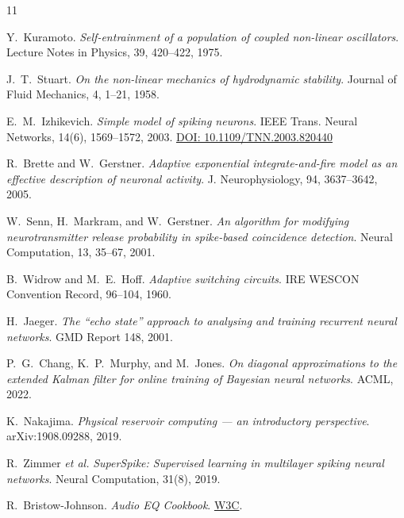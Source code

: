 \documentclass[twocolumn,10pt]{article}
\begin{document}
\begin{thebibliography}{11}

Y.~Kuramoto.
\emph{Self-entrainment of a population of coupled non-linear oscillators}.
Lecture Notes in Physics, 39, 420--422, 1975.

J.~T.~Stuart.
\emph{On the non-linear mechanics of hydrodynamic stability}.
Journal of Fluid Mechanics, 4, 1--21, 1958.

E.~M.~Izhikevich.
\emph{Simple model of spiking neurons}.
IEEE Trans. Neural Networks, 14(6), 1569--1572, 2003.
\href{https://doi.org/10.1109/TNN.2003.820440}{DOI: 10.1109/TNN.2003.820440}

R.~Brette and W.~Gerstner.
\emph{Adaptive exponential integrate-and-fire model as an effective description of neuronal activity}.
J. Neurophysiology, 94, 3637--3642, 2005.

W.~Senn, H.~Markram, and W.~Gerstner.
\emph{An algorithm for modifying neurotransmitter release probability in spike-based coincidence detection}.
Neural Computation, 13, 35--67, 2001.

B.~Widrow and M.~E.~Hoff.
\emph{Adaptive switching circuits}.
IRE WESCON Convention Record, 96--104, 1960.

H.~Jaeger.
\emph{The ``echo state'' approach to analysing and training recurrent neural networks}.
GMD Report 148, 2001.

P.~G.~Chang, K.~P.~Murphy, and M.~Jones.
\emph{On diagonal approximations to the extended Kalman filter for online training of Bayesian neural networks}.
ACML, 2022.

K.~Nakajima.
\emph{Physical reservoir computing --- an introductory perspective}.
arXiv:1908.09288, 2019.

R.~Zimmer \emph{et al.}
\emph{SuperSpike: Supervised learning in multilayer spiking neural networks}.
Neural Computation, 31(8), 2019.

R.~Bristow-Johnson.
\emph{Audio EQ Cookbook}.
\href{https://www.w3.org/TR/audio-eq-cookbook/}{W3C}.

\end{thebibliography}

\appendix
\end{document}
